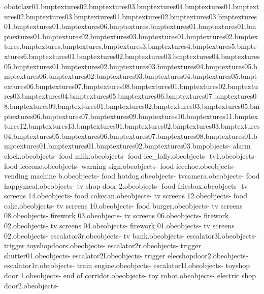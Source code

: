 obotclaw01.bmp textures\robotclaw02.bmp textures\robotclaw03.bmp textures\robotclaw04.bmp textures\robotface01.bmp textures\robotface02.bmp textures\robotface03.bmp textures\robotfront01.bmp textures\robotfront02.bmp textures\robotfront03.bmp textures\robotleg01.bmp textures\robotside01.bmp textures\rocket06.bmp textures\rocketbox.bmp textures\roxtex01.bmp textures\samcake01.bmp textures\samcan01.bmp textures\samcan02.bmp textures\samcan03.bmp textures\samcerealbox01.bmp textures\samcerealbox02.bmp textures\samcerealboxsides.bmp textures\samtea.bmp textures\seatsianextra.bmp textures\seatsianextra3.bmp textures\seatsianextra4.bmp textures\seatsianextra5.bmp textures\seatsianextra6.bmp textures\shelf01.bmp textures\shelf02.bmp textures\shelf03.bmp textures\shelf04.bmp textures\shelf05.bmp textures\shopbed01.bmp textures\shopbed02.bmp textures\shopbed03.bmp textures\shopbed04.bmp textures\shopbed05.bmp textures\shopbed06.bmp textures\shopblackfloor02.bmp textures\shopblackfloor03.bmp textures\shopblackfloor04.bmp textures\shopblackfloor05.bmp textures\shopblackfloor06.bmp textures\shopblackfloor07.bmp textures\shopblackfloor08.bmp textures\shopbowl01.bmp textures\shopbowl02.bmp textures\shopbowl03.bmp textures\shopbowl04.bmp textures\shopbowl05.bmp textures\shopbowl06.bmp textures\shopbowl07.bmp textures\shopbowl08.bmp textures\shopbowl09.bmp textures\shopdanger01.bmp textures\shopdanger02.bmp textures\shopdanger03.bmp textures\shopdanger05.bmp textures\shopdanger06.bmp textures\shopdanger07.bmp textures\shopdanger09.bmp textures\shopdanger10.bmp textures\shopdanger11.bmp textures\shopdanger12.bmp textures\shopdanger13.bmp textures\shopdough01.bmp textures\shopdough02.bmp textures\shopdough03.bmp textures\shopdough04.bmp textures\shopdough05.bmp textures\shopdough06.bmp textures\shopdough07.bmp textures\shopdough08.bmp textures\shopexplode01.bmp textures\shopfloorsamat01.bmp textures\shopsgensign01.bmp textures\shopsgensign02.bmp textures\shopsgensign03.bmp objects\bank - alarm clock.obe objects\bank - food milk.obe objects\bank - food ice_lolly.obe objects\bank -  tv1.obe objects\bank - food icecone.obe objects\bank - warning sign.obe objects\bank - food icechoc.obe objects\bank - vending machine b.obe objects\bank - food hotdog.obe objects\bank - tvcamera.obe objects\bank - food happymeal.obe objects\bank - tv shop door 2.obe objects\bank - food friesbox.obe objects\bank - tv screens 14.obe objects\bank - food cokecan.obe objects\bank - tv screens 12.obe objects\bank - food cake.obe objects\bank - tv screens 10.obe objects\bank - food burger.obe objects\bank - tv screens 08.obe objects\bank - firework 03.obe objects\bank - tv screens 06.obe objects\bank - firework 02.obe objects\bank - tv screens 04.obe objects\bank - firework 01.obe objects\bank - tv screens 02.obe objects\bank - escalator3r.obe objects\bank - tv bank.obe objects\bank - escalator3l.obe objects\bank - trigger toyshopdoors.obe objects\bank - escalator2r.obe objects\bank - trigger shutter01.obe objects\bank - escalator2l.obe objects\bank - trigger elecshopdoor2.obe objects\bank - escalator1r.obe objects\bank - train engine.obe objects\bank - escalator1l.obe objects\bank - toyshop door 1.obe objects\bank - end of corridor.obe objects\bank - toy robot.obe objects\bank - electric shop door2.obe objects\bank - 